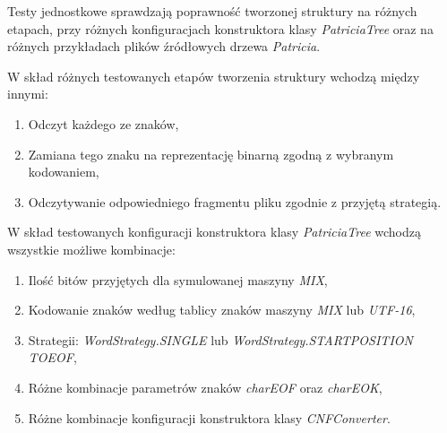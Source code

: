 		Testy jednostkowe sprawdzają poprawność tworzonej struktury na różnych etapach, przy różnych konfiguracjach konstruktora klasy \emph{PatriciaTree} oraz na różnych przykładach plików źródłowych drzewa \emph{Patricia}. 
		
		W skład różnych testowanych etapów tworzenia struktury wchodzą między innymi: 
		\begin{enumerate}
		    \item Odczyt każdego ze znaków, 
		    \item Zamiana tego znaku na reprezentację binarną zgodną z wybranym kodowaniem,
		    \item Odczytywanie odpowiedniego fragmentu pliku zgodnie z przyjętą strategią.
		\end{enumerate}
		
		W skład testowanych konfiguracji konstruktora klasy \emph{PatriciaTree} wchodzą wszystkie możliwe kombinacje:
		\begin{enumerate}
		    \item Ilość bitów przyjętych dla symulowanej maszyny \emph{MIX},
		    \item Kodowanie znaków według tablicy znaków maszyny \emph{MIX} lub \emph{UTF-16},
		    \item Strategii: \emph{WordStrategy.SINGLE} lub \emph{WordStrategy.START\textunderscore POSITION \textunderscore TO\textunderscore EOF},
		    \item Różne kombinacje parametrów znaków \emph{charEOF} oraz \emph{charEOK},
		    \item Różne kombinacje konfiguracji konstruktora klasy \emph{CNFConverter}.
		\end{enumerate}
		
